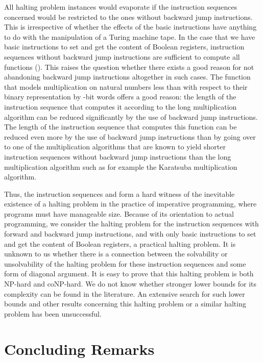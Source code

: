 \documentclass{llncs}
\begin{document}
All halting problem instances would evaporate if the instruction 
sequences concerned would be restricted to the ones without backward 
jump instructions.
This is irrespective of whether the effects of the basic instructions 
have anything to do with the manipulation of a Turing machine tape.
In the case that we have basic instructions to set and get the content 
of Boolean registers, instruction sequences without backward jump 
instructions are sufficient to compute all functions 
 ().
This raises the question whether there exists a good reason for not 
abandoning backward jump instructions altogether in such cases.
The function that models multiplication on natural numbers less than 
 with respect to their binary representation by -bit words 
offers a good reason: the length of the instruction sequence that 
computes it according to the long multiplication algorithm can be 
reduced significantly by the use of backward jump instructions.
The length of the instruction sequence that computes this function can 
be reduced even more by the use of backward jump instructions than by 
going over to one of the multiplication algorithms that are known to 
yield shorter instruction sequences without backward jump instructions 
than the long multiplication algorithm such as for example the Karatsuba 
multiplication algorithm.

Thus, the instruction sequences  and  form a 
hard witness of the inevitable existence of a halting problem in the 
practice of imperative programming, where programs must have manageable 
size.
Because of its orientation to actual programming, we consider the 
halting problem for the instruction sequences with forward and backward 
jump instructions, and with only basic instructions to set and get the 
content of Boolean registers, a practical halting problem.
It is unknown to us whether there is a connection between the 
solvability or unsolvability of the halting problem for these 
instruction sequences and some form of diagonal argument.
It is easy to prove that this halting problem is both NP-hard and 
coNP-hard.
We do not know whether stronger lower bounds for its complexity can be 
found in the literature.
An extensive search for such lower bounds and other results concerning 
this halting problem or a similar halting problem has been unsuccessful.

\section{Concluding Remarks}
\label{sect-concl}
\end{document}
